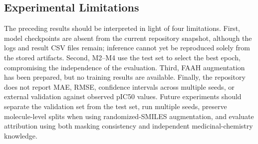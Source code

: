 \subsection{Experimental Limitations}

The preceding results should be interpreted in light of four limitations.
First, model checkpoints are absent from the current repository snapshot,
although the logs and result CSV files remain; inference cannot yet be
reproduced solely from the stored artifacts. Second, M2--M4 use the test set to
select the best epoch, compromising the independence of the evaluation. Third,
FAAH augmentation has been prepared, but no training results are available.
Finally, the repository does not report MAE, RMSE, confidence intervals across
multiple seeds, or external validation against observed pIC50 values. Future
experiments should separate the validation set from the test set, run multiple
seeds, preserve molecule-level splits when using randomized-SMILES augmentation,
and evaluate attribution using both masking consistency and independent
medicinal-chemistry knowledge.



